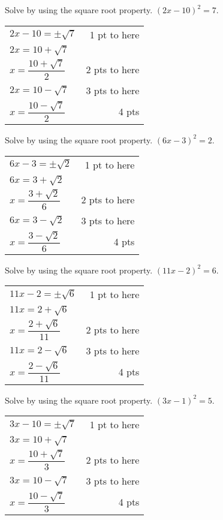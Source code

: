 {
	Solve by using the square root property. $\displaystyle (2x-10)^2=7$.
}
{
	\begin{tabular}{l r}
	$2x-10=\pm\sqrt{7}$ & 1 pt to here\\
	$2x=10+\sqrt{7}$ &  \\
	$x=\dfrac{10+\sqrt{7}}{2}$ & 2 pts to here \\
	$2x=10-\sqrt{7}$ & 3 pts to here\\
	$x=\dfrac{10-\sqrt{7}}{2}$ & 4 pts \\
	\end{tabular}
}

{
	Solve by using the square root property. $\displaystyle (6x-3)^2=2$.
}
{
	\begin{tabular}{l r}
	$6x-3=\pm\sqrt{2}$ & 1 pt to here\\
	$6x=3+\sqrt{2}$ &  \\
	$x=\dfrac{3+\sqrt{2}}{6}$ & 2 pts to here \\
	$6x=3-\sqrt{2}$ & 3 pts to here\\
	$x=\dfrac{3-\sqrt{2}}{6}$ & 4 pts \\
	\end{tabular}
}

{
	Solve by using the square root property. $\displaystyle (11x-2)^2=6$.
}
{
	\begin{tabular}{l r}
	$11x-2=\pm\sqrt{6}$ & 1 pt to here\\
	$11x=2+\sqrt{6}$ &  \\
	$x=\dfrac{2+\sqrt{6}}{11}$ & 2 pts to here \\
	$11x=2-\sqrt{6}$ & 3 pts to here\\
	$x=\dfrac{2-\sqrt{6}}{11}$ & 4 pts \\
	\end{tabular}
}

{
	Solve by using the square root property. $\displaystyle (3x-1)^2=5$.
}
{
	\begin{tabular}{l r}
	$3x-10=\pm\sqrt{7}$ & 1 pt to here\\
	$3x=10+\sqrt{7}$ &  \\
	$x=\dfrac{10+\sqrt{7}}{3}$ & 2 pts to here \\
	$3x=10-\sqrt{7}$ & 3 pts to here\\
	$x=\dfrac{10-\sqrt{7}}{3}$ & 4 pts \\
	\end{tabular}
}
